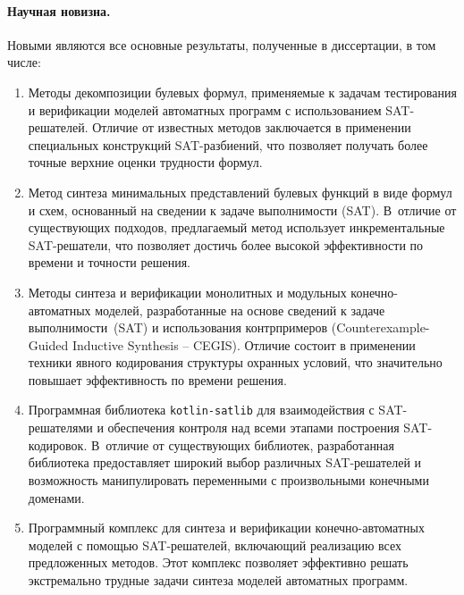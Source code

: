 %
%
\paragraph{Научная новизна.}
%
Новыми являются все основные результаты, полученные в диссертации, в том числе:
\begin{enumerate}[beginpenalty=10000]
    \item Методы декомпозиции булевых формул, применяемые к задачам тестирования и верификации моделей автоматных программ с использованием SAT-решателей. Отличие от известных методов заключается в применении специальных конструкций SAT-разбиений, что позволяет получать более точные верхние оценки трудности формул.

    \item Метод синтеза минимальных представлений булевых функций в виде формул и схем, основанный на сведении к задаче выполнимости (SAT). В~отличие от существующих подходов, предлагаемый метод использует инкрементальные SAT-решатели, что позволяет достичь более высокой эффективности по времени и точности решения.

    \item Методы синтеза и верификации монолитных и модульных конечно-авто\-мат\-ных моделей, разработанные на основе сведений к задаче выполнимости~(SAT) и использования контрпримеров (Counter\-example-Guided Inductive Synthesis \--- CEGIS). Отличие состоит в применении техники явного кодирования структуры охранных условий, что значительно повышает эффективность по времени решения.

    \item Программная библиотека \texttt{kotlin-satlib} для взаимодействия с SAT-решателями и обеспечения контроля над всеми этапами построения SAT-кодировок. В~отличие от существующих библиотек, разработанная библиотека предоставляет широкий выбор различных SAT-решателей и возможность манипулировать переменными с произвольными конечными доменами.

    \item Программный комплекс  для синтеза и верификации конечно-автоматных моделей с помощью SAT-решателей, включающий реализацию всех предложенных методов. Этот комплекс позволяет эффективно решать экстремально трудные задачи синтеза моделей автоматных программ.
\end{enumerate}


%
%
